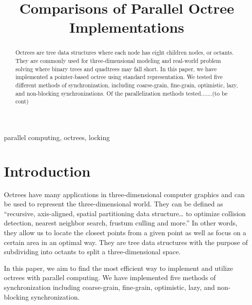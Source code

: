 \documentclass[conference]{IEEEtran}
\begin{document}
\title{Comparisons of Parallel Octree Implementations
}

\author{

}


\maketitle

\begin{abstract}
Octrees are tree data structures where each node has eight children nodes, or octants. They are commonly used for three-dimensional modeling and real-world problem solving where binary trees and quadtrees may fall short. In this paper, we have implemented a pointer-based octree using standard representation. We tested five different methods of synchronization, including coarse-grain, fine-grain, optimistic, lazy, and non-blocking synchronizations. Of the parallelization methods tested.......(to be cont)

\end{abstract}

\begin{IEEEkeywords}
parallel computing, octrees, locking
\end{IEEEkeywords}

\section{Introduction}

Octrees have many applications in three-dimensional computer graphics and can be used to represent the three-dimensional world. They can be defined as “recursive, axis-aligned, spatial partitioning data structure… to optimize collision detection, nearest neighbor search, frustum culling and more.” \cite{octrees1} In other words, they allow us to locate the closest points from a given point as well as focus on a certain area in an optimal way. They are tree data structures with the purpose of subdividing into octants to split a three-dimensional space.

In this paper, we aim to find the most efficient way to implement and utilize octrees with parallel computing. We have implemented five methods of synchronization including coarse-grain, fine-grain, optimistic, lazy, and non-blocking synchronization. 
\end{document}
